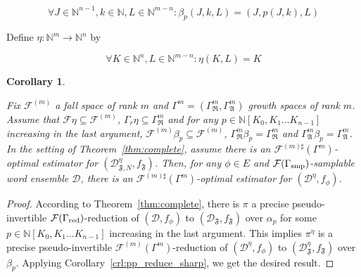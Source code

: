 \documentclass{article}
\numberwithin{equation}{section}
\theoremstyle{definition}
\theoremstyle{plain}
\newtheorem{corollary}{Corollary}[section]
\newcommand{\Nats}{\mathbb{N}}
\newcommand{\NatPoly}{\Nats[K_0, K_1 \ldots K_{n-1}]}
\newcommand{\Dist}{\mathcal{D}}
\newcommand{\GrowR}{\Gamma_{\mathfrak{R}}}
\newcommand{\GrowA}{\Gamma_{\mathfrak{A}}}
\newcommand{\Fall}{\mathcal{F}}
\begin{document}
\begin{equation}
\forall J \in \Nats^{n-1}, k \in \Nats, L \in \Nats^{m-n}: \beta_p(J,k,L)=(J,p(J,k),L)
\end{equation}

Define ${\eta: \Nats^{m} \rightarrow \Nats^n}$ by

\begin{equation}
\forall K \in \Nats^n, L \in \Nats^{m-n}: \eta(K,L)=K
\end{equation}


\begin{samepage}
\begin{corollary}
\label{crl:complete_sharp}

Fix ${\Fall^{(m)}}$ a fall space of rank ${m}$ and ${\Gamma^m=(\GrowR^m, \GrowA^m)}$ growth spaces of rank ${m}$. Assume that ${\Fall \eta \subseteq \Fall^{(m)}}$, ${\Gamma_r \eta \subseteq \GrowR^{m}}$ and for any ${p \in \NatPoly}$ increasing in the last argument, ${\Fall^{(m)} \beta_p \subseteq \Fall^{(m)}}$, ${\GrowR^m \beta_p = \GrowR^m}$ and ${\GrowA^m \beta_p = \GrowA^m}$. In the setting of Theorem~\ref{thm:complete}, assume there is an ${\Fall^{(m)\sharp}(\Gamma^m)}$-optimal estimator for ${(\Dist_{\mathfrak{F},N}^\eta,f_{\mathfrak{F}})}$. Then, for any ${\phi \in E}$ and ${\Fall(\Gamma_{\textnormal{smp}})}$-samplable word ensemble ${\Dist}$, there is an ${\Fall^{(m)\sharp}(\Gamma^m)}$-optimal estimator for ${(\Dist^\eta,f_\phi)}$.

\end{corollary}
\end{samepage}

\begin{proof}

According to Theorem~\ref{thm:complete}, there is ${\pi}$ a precise pseudo-invertible ${\Fall(\Gamma_{\textnormal{red}})}$-reduction of ${(\Dist,f_\phi)}$ to ${(\Dist_{\mathfrak{F}},f_{\mathfrak{F}})}$ over ${\alpha_p}$ for some ${p \in \NatPoly}$  increasing in the last argument. This implies ${\pi^\eta}$ is a precise pseudo-invertible ${\Fall^{(m)}(\Gamma^m)}$-reduction of ${(\Dist^\eta,f_\phi)}$ to ${(\Dist_{\mathfrak{F}}^\eta,f_{\mathfrak{F}})}$ over ${\beta_p}$. Applying Corollary~\ref{crl:pp_reduce_sharp}, we get the desired result. 
%
\end{proof}
\end{document}
